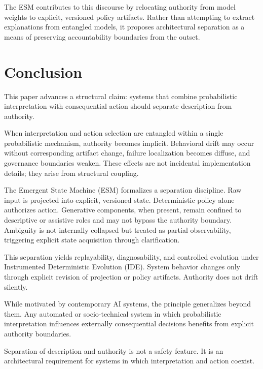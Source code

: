 \documentclass[11pt]{article}
\begin{document}
The ESM contributes to this discourse by relocating authority from model weights to explicit, versioned policy artifacts. Rather than attempting to extract explanations from entangled models, it proposes architectural separation as a means of preserving accountability boundaries from the outset.



\section{Conclusion}

This paper advances a structural claim: systems that combine probabilistic interpretation with consequential action should separate description from authority.

When interpretation and action selection are entangled within a single probabilistic mechanism, authority becomes implicit. Behavioral drift may occur without corresponding artifact change, failure localization becomes diffuse, and governance boundaries weaken. These effects are not incidental implementation details; they arise from structural coupling.

The Emergent State Machine (ESM) formalizes a separation discipline. Raw input is projected into explicit, versioned state. Deterministic policy alone authorizes action. Generative components, when present, remain confined to descriptive or assistive roles and may not bypass the authority boundary. Ambiguity is not internally collapsed but treated as partial observability, triggering explicit state acquisition through clarification.

This separation yields replayability, diagnosability, and controlled evolution under Instrumented Deterministic Evolution (IDE). System behavior changes only through explicit revision of projection or policy artifacts. Authority does not drift silently.

While motivated by contemporary AI systems, the principle generalizes beyond them. Any automated or socio-technical system in which probabilistic interpretation influences externally consequential decisions benefits from explicit authority boundaries.

Separation of description and authority is not a safety feature. It is an architectural requirement for systems in which interpretation and action coexist.





\end{document}
